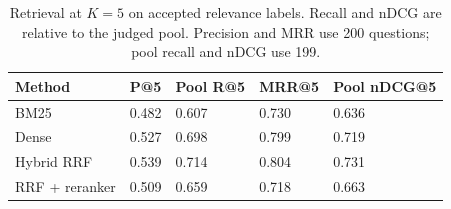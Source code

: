 \begin{table}[htbp]\centering
\caption{Retrieval at $K=5$ on accepted relevance labels. Recall and nDCG are relative to the judged pool. Precision and MRR use 200 questions; pool recall and nDCG use 199.}\label{tab:retrieval}
\begin{tabularx}{\linewidth}{YYYYY}\toprule
Method & P@5 & Pool R@5 & MRR@5 & Pool nDCG@5\\\midrule
BM25 & 0.482 & 0.607 & 0.730 & 0.636\\
Dense & 0.527 & 0.698 & 0.799 & 0.719\\
Hybrid RRF & 0.539 & 0.714 & 0.804 & 0.731\\
RRF + reranker & 0.509 & 0.659 & 0.718 & 0.663\\\bottomrule\end{tabularx}\end{table}
